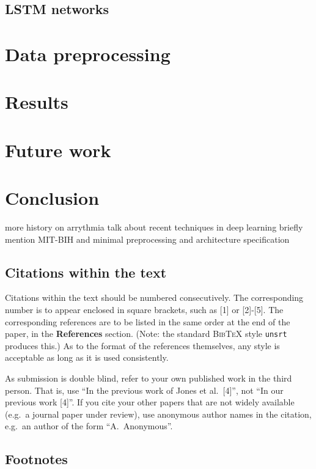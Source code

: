\documentclass{article} %
\begin{document}
\subsection{LSTM networks}

\section{Data preprocessing}

\section{Results}

\section{Future work}

\section{Conclusion}

more history on arrythmia
talk about recent techniques in deep learning
briefly mention MIT-BIH and minimal preprocessing and architecture specification

\subsection{Citations within the text}

Citations within the text should be numbered consecutively. The corresponding
number is to appear enclosed in square brackets, such as [1] or [2]-[5]. The
corresponding references are to be listed in the same order at the end of the
paper, in the \textbf{References} section. (Note: the standard
\textsc{Bib\TeX} style \texttt{unsrt} produces this.) As to the format of the
references themselves, any style is acceptable as long as it is used
consistently.

As submission is double blind, refer to your own published work in the 
third person. That is, use ``In the previous work of Jones et al.\ [4]'',
not ``In our previous work [4]''. If you cite your other papers that
are not widely available (e.g.\ a journal paper under review), use
anonymous author names in the citation, e.g.\ an author of the
form ``A.\ Anonymous''. 


\subsection{Footnotes}
\end{document}
